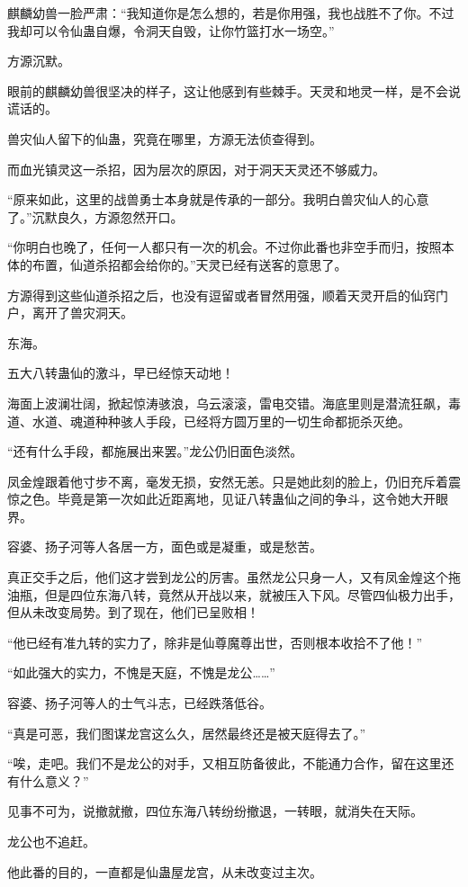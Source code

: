 \begin{this_body}
麒麟幼兽一脸严肃：“我知道你是怎么想的，若是你用强，我也战胜不了你。不过我却可以令仙蛊自爆，令洞天自毁，让你竹篮打水一场空。”

方源沉默。

眼前的麒麟幼兽很坚决的样子，这让他感到有些棘手。天灵和地灵一样，是不会说谎话的。

兽灾仙人留下的仙蛊，究竟在哪里，方源无法侦查得到。

而血光镇灵这一杀招，因为层次的原因，对于洞天天灵还不够威力。

“原来如此，这里的战兽勇士本身就是传承的一部分。我明白兽灾仙人的心意了。”沉默良久，方源忽然开口。

“你明白也晚了，任何一人都只有一次的机会。不过你此番也非空手而归，按照本体的布置，仙道杀招都会给你的。”天灵已经有送客的意思了。

方源得到这些仙道杀招之后，也没有逗留或者冒然用强，顺着天灵开启的仙窍门户，离开了兽灾洞天。

东海。

五大八转蛊仙的激斗，早已经惊天动地！

海面上波澜壮阔，掀起惊涛骇浪，乌云滚滚，雷电交错。海底里则是潜流狂飙，毒道、水道、魂道种种骇人手段，已经将方圆万里的一切生命都扼杀灭绝。

“还有什么手段，都施展出来罢。”龙公仍旧面色淡然。

凤金煌跟着他寸步不离，毫发无损，安然无恙。只是她此刻的脸上，仍旧充斥着震惊之色。毕竟是第一次如此近距离地，见证八转蛊仙之间的争斗，这令她大开眼界。

容婆、扬子河等人各居一方，面色或是凝重，或是愁苦。

真正交手之后，他们这才尝到龙公的厉害。虽然龙公只身一人，又有凤金煌这个拖油瓶，但是四位东海八转，竟然从开战以来，就被压入下风。尽管四仙极力出手，但从未改变局势。到了现在，他们已呈败相！

“他已经有准九转的实力了，除非是仙尊魔尊出世，否则根本收拾不了他！”

“如此强大的实力，不愧是天庭，不愧是龙公……”

容婆、扬子河等人的士气斗志，已经跌落低谷。

“真是可恶，我们图谋龙宫这么久，居然最终还是被天庭得去了。”

“唉，走吧。我们不是龙公的对手，又相互防备彼此，不能通力合作，留在这里还有什么意义？”

见事不可为，说撤就撤，四位东海八转纷纷撤退，一转眼，就消失在天际。

龙公也不追赶。

他此番的目的，一直都是仙蛊屋龙宫，从未改变过主次。


\end{this_body}
